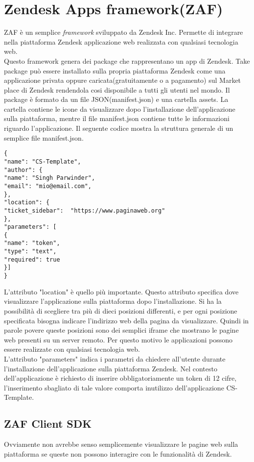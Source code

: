 \section{Zendesk Apps framework(ZAF)}
ZAF è un semplice \emph{framework} sviluppato da Zendesk Inc. Permette di integrare nella piattaforma Zendesk applicazione web realizzata con qualsiasi tecnologia web. 
\\

Questo framework genera dei package che rappresentano un app di Zendesk.
Take package può essere installato sulla propria piattaforma Zendesk come una applicazione privata oppure caricata(gratuitamente o a pagamento) sul Market place di Zendesk rendendola cosi disponibile a tutti gli utenti nel mondo. Il package è formato da un file JSON(manifest.json) e una cartella assets. La cartella contiene le icone da visualizzare dopo l'installazione dell'applicazione sulla piattaforma, mentre il file manifest.json contiene tutte le informazioni riguardo l'applicazione. Il seguente codice mostra la struttura generale di un semplice file manifest.json. \\
\begin{lstlisting}
{
"name": "CS-Template",
"author": {
"name": "Singh Parwinder",
"email": "mio@email.com",
},
"location": {
"ticket_sidebar":  "https://www.paginaweb.org"
},	
"parameters": [
{
"name": "token",
"type": "text",
"required": true
}]
}
\end{lstlisting}
L'attributo "location" è quello più importante. Questo attributo specifica dove visualizzare l'applicazione sulla piattaforma dopo l'installazione. Si ha la possibilità di scegliere tra più di dieci posizioni differenti, e per ogni posizione specificata bisogna indicare l'indirizzo web della pagina da visualizzare. Quindi in parole povere queste posizioni sono dei semplici \gls{iframe} che mostrano le pagine web presenti su un server remoto.   Per questo motivo le applicazioni possono essere realizzate con qualsiasi tecnologia web. 
\\

L'attributo "parameters" indica i parametri da chiedere all'utente durante l'installazione dell'applicazione sulla piattaforma Zendesk. Nel contesto dell'applicazione è richiesto di inserire obbligatoriamente un token di 12 cifre, l'inserimento sbagliato di tale valore comporta inutilizzo dell'applicazione CS-Template. 

\subsection{ZAF Client SDK}
Ovviamente non avrebbe senso semplicemente visualizzare le pagine web sulla piattaforma se queste non possono interagire con le funzionalità di Zendesk. 
\\


